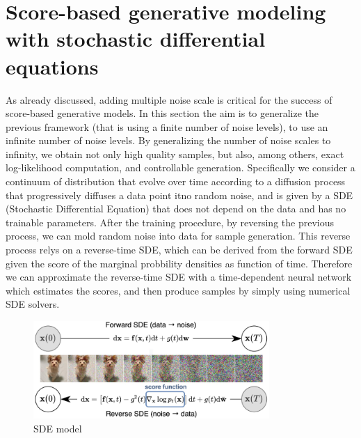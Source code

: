 \documentclass{article}
\begin{document}
     \section{Score-based generative modeling with stochastic differential equations}
     As already discussed, adding multiple noise scale is critical for the success of score-based generative models. In this section the aim is to generalize the previous framework (that is using a finite number of noise levels), to use an infinite number of noise levels. By generalizing the number of noise scales to infinity, we obtain not only high quality samples, but also, among others, exact log-likelihood computation, and controllable generation. Specifically we consider a continuum of distribution that evolve over time according to a diffusion process that progressively diffuses a data point itno random noise, and is given by a SDE (Stochastic Differential Equation) that does not depend on the data and has no trainable parameters. After the training procedure, by reversing the previous process, we can mold random noise into data for sample generation. This reverse process relys on a reverse-time SDE, which can be derived from the forward SDE given the score of the marginal probbility densities as function of time. Therefore we can approximate the reverse-time SDE with a time-dependent neural network which estimates the scores, and then produce samples by simply using numerical SDE solvers.\\
      \begin{figure}[htbp]
    	\centering
    	\includegraphics[width=0.8\textwidth]{SDEmodel} 
    	\caption{SDE model}
\end{figure}
\end{document}
